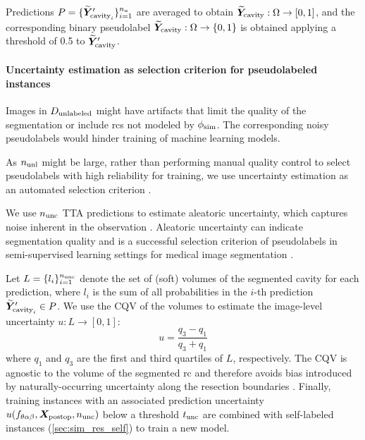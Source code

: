 Predictions $P = \{ \widetilde{\bm{Y}}'_{\text{cavity}_i} \}_{i=1}^{n_{\textnormal{u}}}$ are averaged to obtain $\widetilde{\bm{Y}}_{\textnormal{cavity}} : \Omega \to [0, 1]$, and the corresponding binary pseudolabel $\widetilde{\bm{Y}}_{\textnormal{cavity}} : \Omega \to  \{ 0, 1 \}$ is obtained applying a threshold of 0.5 to $\widetilde{\bm{Y}}'_{\textnormal{cavity}}$.


\paragraph{Uncertainty estimation as selection criterion for pseudolabeled instances}

Images in $D_{\textnormal{unlabeled}}$ might have artifacts that limit the quality of the segmentation or include \acp{rc} not modeled by $\phi_{\textnormal{sim}}$.
The corresponding noisy pseudolabels would hinder training of machine learning models.

As $n_{\textnormal{unl}}$ might be large, rather than performing manual quality control to select pseudolabels with high reliability for training, we use uncertainty estimation as an automated selection criterion \cite{venturini_uncertainty_2020}.

We use $n_{\textnormal{unc}}$ \ac{TTA} predictions to estimate aleatoric uncertainty, which captures noise inherent in the observation \cite{kendall_what_2017}.
Aleatoric uncertainty can indicate segmentation quality and is a successful selection criterion of pseudolabels in semi-supervised learning settings for medical image segmentation \cite{wang_aleatoric_2019,venturini_uncertainty_2020}.

Let $L = \{ l_i \}_{i = 1}^{n_{\textnormal{unc}}}$ denote the set of (soft) volumes of the segmented cavity for each prediction, where $l_i$ is the sum of all probabilities in the $i$-th prediction $\widetilde{\bm{Y}}'_{\text{cavity}_i} \in P$.
We use the \ac{CQV} of the volumes \cite{zwillinger_crc_1999,wang_aleatoric_2019} to estimate the image-level uncertainty $u : L \to \left[0, 1\right]$:
\begin{equation}
    u = \frac{q_3 - q_1}{q_3 + q_1}
\end{equation}
where $q_1$ and $q_3$ are the first and third quartiles of $L$, respectively.
The \ac{CQV} is agnostic to the volume of the segmented \ac{rc} and therefore avoids bias introduced by naturally-occurring uncertainty along the resection boundaries \cite{jungo_analyzing_2020}.
Finally, training instances with an associated prediction uncertainty $u(f_{\theta\alpha\beta}, \bm{X}_{\textnormal{postop}}, n_{\textnormal{unc}})$ below a threshold $t_{\textnormal{unc}}$ are combined with self-labeled instances (\cref{sec:sim_res_self}) to train a new model.
